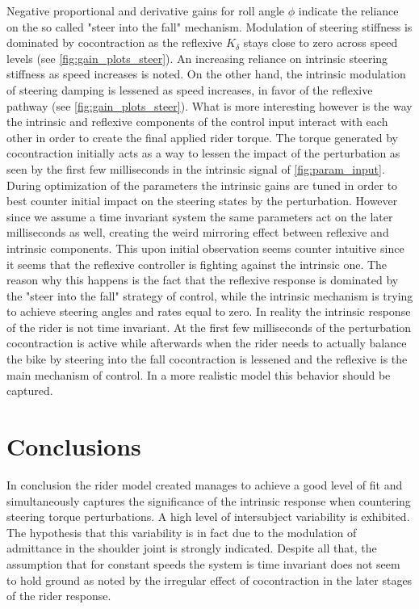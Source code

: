 Negative proportional and derivative gains for roll angle \ensuremath{\phi} indicate the reliance on the so called "steer into the fall" mechanism.   Modulation of steering stiffness is dominated by cocontraction as the reflexive \ensuremath{K_\delta} stays close to zero across speed levels (see \cref{fig:gain_plots_steer}). An increasing reliance on intrinsic steering stiffness as speed increases is noted. On the other hand, the intrinsic modulation of steering damping is lessened as speed increases, in favor of the reflexive pathway (see \cref{fig:gain_plots_steer}). What is more interesting however is the way the intrinsic and reflexive components of the control input interact with each other in order to create the final applied rider torque. The torque generated by cocontraction initially acts as a way to lessen the  impact of the perturbation as seen by the first few milliseconds in the intrinsic signal of \cref{fig:param_input}. During optimization of the parameters the intrinsic gains are tuned in order to best counter initial impact on the steering states by the perturbation. However since we assume a time invariant  system the same parameters act on the later milliseconds as well, creating the weird mirroring effect between reflexive and intrinsic components. This upon initial observation seems counter intuitive since it seems that the reflexive controller is fighting against the intrinsic one. The reason why this happens is the fact that the reflexive response is dominated by the "steer into the fall" strategy of control, while the intrinsic mechanism is trying to achieve  steering angles and rates equal to zero. In reality the intrinsic response of the rider is not time invariant. At the first few milliseconds of the perturbation cocontraction is active while afterwards when the rider needs to actually balance the bike by steering into the fall cocontraction is lessened and the reflexive is the main mechanism of control.  In a more realistic model this behavior should be captured.
\section{Conclusions}
In conclusion the rider model created manages to achieve a good level of fit and simultaneously captures the significance of the intrinsic response when countering steering torque perturbations. A high level of intersubject variability is exhibited. The hypothesis that this variability is in fact due to the modulation of admittance in the shoulder joint is strongly indicated. Despite all that,  the assumption that for constant speeds the system is time invariant does not seem to hold ground as noted by the irregular effect of cocontraction in the later stages of the rider  response.


